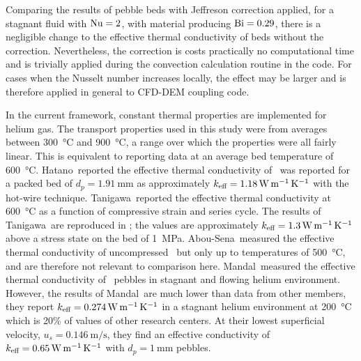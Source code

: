 \FloatBarrier

Comparing the results of pebble beds with Jeffreson correction applied, for a stagnant fluid with $\mathrm{Nu} = 2$, with material producing $\mathrm{Bi} = 0.29$, there is a negligible change to the effective thermal conductivity of beds without the correction. Nevertheless, the correction is costs practically no computational time and is trivially applied during the convection calculation routine in the code. For cases when the Nusselt number increases locally, the effect may be larger and is therefore applied in general to CFD-DEM coupling code.

In the current framework, constant thermal properties are implemented for helium gas. The transport properties used in this study were from averages between \SI{300}{\celsius} and \SI{900}{\celsius}, a range over which the properties were all fairly linear. This is equivalent to reporting data at an average bed temperature of \SI{600}{\celsius}. Hatano\etal~reported the effective thermal conductivity of \lit~was reported for a packed bed of $d_p = \SI{1.91}{\milli\meter}$ as approximately $k_\text{eff} =\SI{1.18}{\watt\per\meter\per\kelvin}$ with the hot-wire technique.\cite{Hatano2003} Tanigawa\etal~reported the effective thermal conductivity at \SI{600}{\celsius} as a function of compressive strain and series cycle.\cite{Tanigawa2005801} The results of Tanigawa\etal~are reproduced in ; the values are approximately $k_\text{eff} =\SI{1.3}{\watt\per\meter\per\kelvin}$ above a stress state on the bed of \SI{1}{\mega\pascal}. Abou-Sena\etal~measured the effective thermal conductivity of uncompressed \lit~but only up to temperatures of \SI{500}{\celsius}, and are therefore not relevant to comparison here.\cite{Abou-Sena:2007ff} Mandal\etal~measured the effective thermal conductivity of \lit~pebbles in stagnant and flowing helium environment.\cite{Mandal2012} However, the results of Mandal\etal~are much lower than data from other members, they report $k_\text{eff} =\SI{0.274}{\watt\per\meter\per\kelvin}$ in a stagnant helium environment at \SI{200}{\celsius} which is 20\% of values of other research centers. At their lowest superficial velocity, $u_s = \SI{0.146}{\meter\per\second}$, they find an effective conductivity of $k_\text{eff} = \SI{0.65}{\watt\per\meter\per\kelvin}$ with $d_p = \SI{1}{\milli\meter}$ pebbles.

